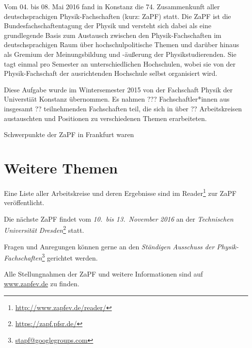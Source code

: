 Vom 04. bis 08. Mai 2016 fand in Konstanz die 74. Zusammenkunft
aller deutschsprachigen Physik-Fachschaften (kurz: ZaPF) statt.  Die ZaPF ist
die Bundesfachschaftentagung der Physik und versteht sich dabei als eine
grundlegende Basis zum Austausch zwischen den Physik-Fachschaften im
deutschsprachigen Raum über hochschulpolitische Themen und darüber hinaus als
Gremium der Meinungsbildung und -äußerung der Physikstudierenden. Sie tagt
einmal pro Semester an unterschiedlichen Hochschulen, wobei sie von der
Physik-Fachschaft der ausrichtenden Hochschule selbst organisiert wird.

Diese Aufgabe wurde im Wintersemester 2015 von der Fachschaft Physik der Universtiät Konstanz übernommen. Es nahmen ??? Fachschaftler*innen aus
insgesamt ?? teilnehmenden Fachschaften teil, die sich in über ?? Arbeitskreisen
austauschten und Positionen zu verschiedenen Themen erarbeiteten.

Schwerpunkte der ZaPF in Frankfurt waren 

\newpage


\section*{Weitere Themen}

Eine Liste aller Arbeitskreise und deren Ergebnisse sind im
Reader\footnote{\href{http://www.zapfev.de/reader/}{\url{http://www.zapfev.de/reader/}}}
zur ZaPF veröffentlicht.

\vfill

Die nächste ZaPF findet vom \emph{10.\ bis 13.\ November 2016} an der  \emph{Technischen Universität Dresden}\footnote{\href{https://zapf.pfsr.de/}{\url{https://zapf.pfsr.de/}}} statt.

Fragen und Anregungen können gerne an den \emph{Ständigen Ausschuss der Physik-Fachschaften}\footnote{\href{mailto:stapf@googlegroups.com}{\url{stapf@googlegroups.com}}} gerichtet werden.

Alle Stellungnahmen der ZaPF und weitere Informationen sind auf \href{http://www.zapfev.de}{\url{www.zapfev.de}} zu finden. 
